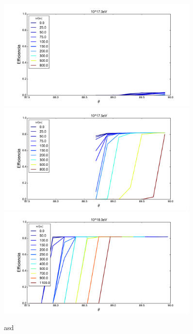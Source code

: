 	\begin{figure}[h!]
		\begin{center}
				\includegraphics[width=0.9\textwidth]{fig/resultadosRadio/eff75_0_4_0_1500_0_1500_0_60_0_1_0_17_0_m2.pdf} 
				\includegraphics[width=0.9\textwidth]{fig/resultadosRadio/eff75_0_4_0_1500_0_1500_0_60_0_1_0_17_5_m2.pdf}
				\includegraphics[width=0.9\textwidth]{fig/resultadosRadio/eff75_0_4_0_1500_0_1500_0_60_0_1_0_18_0_m2.pdf}
			\caption{asd}
			\label{fig:}
		\end{center}
	\end{figure}
	
